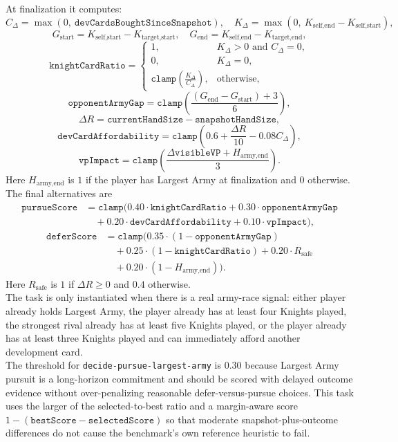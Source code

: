 \documentclass{article}
\begin{document}
At finalization it computes:
\[
C_{\Delta} = \max(0,\ \texttt{devCardsBoughtSinceSnapshot}),
\quad
K_{\Delta} = \max(0,\ K_{\text{self,end}} - K_{\text{self,start}}),
\]
\[
G_{\text{start}} = K_{\text{self,start}} - K_{\text{target,start}},
\quad
G_{\text{end}} = K_{\text{self,end}} - K_{\text{target,end}},
\]
\[
\texttt{knightCardRatio} =
\begin{cases}
1, & K_{\Delta}>0 \text{ and } C_{\Delta}=0,\\
0, & K_{\Delta}=0,\\
\texttt{clamp}\left(\frac{K_{\Delta}}{C_{\Delta}}\right), & \text{otherwise},
\end{cases}
\]
\[
\texttt{opponentArmyGap}
= \texttt{clamp}\left(\frac{(G_{\text{end}} - G_{\text{start}}) + 3}{6}\right),
\]
\[
\Delta R = \texttt{currentHandSize} - \texttt{snapshotHandSize},
\]
\[
\texttt{devCardAffordability}
= \texttt{clamp}\left(0.6 + \frac{\Delta R}{10} - 0.08C_{\Delta}\right),
\]
\[
\texttt{vpImpact}
= \texttt{clamp}\left(\frac{\Delta \texttt{visibleVP} + H_{\text{army,end}}}{3}\right).
\]
Here $H_{\text{army,end}}$ is $1$ if the player has Largest Army at finalization and $0$ otherwise.
The final alternatives are
\[
\begin{aligned}
\texttt{pursueScore}
&= \texttt{clamp}(
0.40 \cdot \texttt{knightCardRatio}
+ 0.30 \cdot \texttt{opponentArmyGap} \\
&\quad + 0.20 \cdot \texttt{devCardAffordability}
+ 0.10 \cdot \texttt{vpImpact}),
\end{aligned}
\]
\[
\begin{aligned}
\texttt{deferScore}
&= \texttt{clamp}\bigl(
0.35 \cdot (1 - \texttt{opponentArmyGap}) \\
&\quad + 0.25 \cdot (1 - \texttt{knightCardRatio})
+ 0.20 \cdot R_{\text{safe}} \\
&\quad
+ 0.20 \cdot (1 - H_{\text{army,end}})\bigr).
\end{aligned}
\]
Here $R_{\text{safe}}$ is $1$ if $\Delta R \ge 0$ and $0.4$ otherwise.
\\
The task is only instantiated when there is a real army-race signal: either player already holds Largest Army, the player already has at least four Knights played, the strongest rival already has at least five Knights played, or the player already has at least three Knights played and can immediately afford another development card.
\\
The threshold for \texttt{decide-pursue-largest-army} is $0.30$ because Largest Army pursuit is a long-horizon commitment and should be scored with delayed outcome evidence without over-penalizing reasonable defer-versus-pursue choices. This task uses the larger of the selected-to-best ratio and a margin-aware score $1-(\texttt{bestScore}-\texttt{selectedScore})$ so that moderate snapshot-plus-outcome differences do not cause the benchmark's own reference heuristic to fail.
\end{document}
